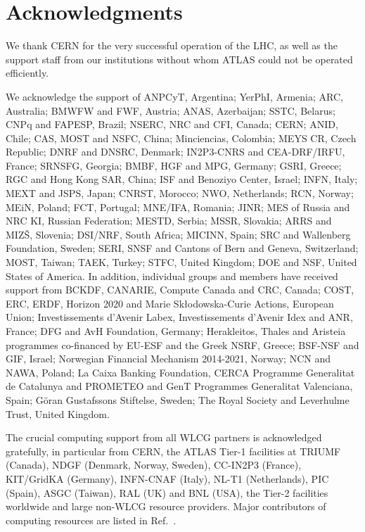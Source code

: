 \documentclass[PAPER, cernpreprint, texlive=2016, paper=a4, USenglish, texmf]{atlasdoc}
\begin{document}
 
 
\section*{Acknowledgments}
 
 
We thank CERN for the very successful operation of the LHC, as well as the
support staff from our institutions without whom ATLAS could not be
operated efficiently.
 
We acknowledge the support of
ANPCyT, Argentina;
YerPhI, Armenia;
ARC, Australia;
BMWFW and FWF, Austria;
ANAS, Azerbaijan;
SSTC, Belarus;
CNPq and FAPESP, Brazil;
NSERC, NRC and CFI, Canada;
CERN;
ANID, Chile;
CAS, MOST and NSFC, China;
Minciencias, Colombia;
MEYS CR, Czech Republic;
DNRF and DNSRC, Denmark;
IN2P3-CNRS and CEA-DRF/IRFU, France;
SRNSFG, Georgia;
BMBF, HGF and MPG, Germany;
GSRI, Greece;
RGC and Hong Kong SAR, China;
ISF and Benoziyo Center, Israel;
INFN, Italy;
MEXT and JSPS, Japan;
CNRST, Morocco;
NWO, Netherlands;
RCN, Norway;
MEiN, Poland;
FCT, Portugal;
MNE/IFA, Romania;
JINR;
MES of Russia and NRC KI, Russian Federation;
MESTD, Serbia;
MSSR, Slovakia;
ARRS and MIZ\v{S}, Slovenia;
DSI/NRF, South Africa;
MICINN, Spain;
SRC and Wallenberg Foundation, Sweden;
SERI, SNSF and Cantons of Bern and Geneva, Switzerland;
MOST, Taiwan;
TAEK, Turkey;
STFC, United Kingdom;
DOE and NSF, United States of America.
In addition, individual groups and members have received support from
BCKDF, CANARIE, Compute Canada and CRC, Canada;
COST, ERC, ERDF, Horizon 2020 and Marie Sk{\l}odowska-Curie Actions, European Union;
Investissements d'Avenir Labex, Investissements d'Avenir Idex and ANR, France;
DFG and AvH Foundation, Germany;
Herakleitos, Thales and Aristeia programmes co-financed by EU-ESF and the Greek NSRF, Greece;
BSF-NSF and GIF, Israel;
Norwegian Financial Mechanism 2014-2021, Norway;
NCN and NAWA, Poland;
La Caixa Banking Foundation, CERCA Programme Generalitat de Catalunya and PROMETEO and GenT Programmes Generalitat Valenciana, Spain;
G\"{o}ran Gustafssons Stiftelse, Sweden;
The Royal Society and Leverhulme Trust, United Kingdom.
 
The crucial computing support from all WLCG partners is acknowledged gratefully, in particular from CERN, the ATLAS Tier-1 facilities at TRIUMF (Canada), NDGF (Denmark, Norway, Sweden), CC-IN2P3 (France), KIT/GridKA (Germany), INFN-CNAF (Italy), NL-T1 (Netherlands), PIC (Spain), ASGC (Taiwan), RAL (UK) and BNL (USA), the Tier-2 facilities worldwide and large non-WLCG resource providers. Major contributors of computing resources are listed in Ref.~\cite{ATL-SOFT-PUB-2021-003}.
 
 
 
 
 
 
 
 
 
 
 
 
 
\clearpage
 
 
 
\printbibliography
 
 
 
 
 
\clearpage

 
\end{document}
